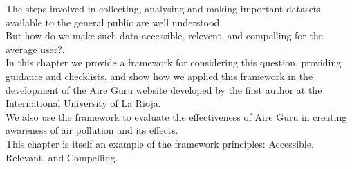 The steps involved in collecting, analysing and making important datasets available to the general public are well understood. \\

But how do we make such data accessible, relevent, and compelling for the average user?. \\

In this chapter we provide a framework for considering this question, providing guidance and checklists,
and show how we applied this framework in the development of the Aire Guru website developed by the first
author at the International University of La Rioja. \\

We also use the framework to evaluate the effectiveness of Aire Guru in creating awareness of air pollution and its effects. \\

This chapter is itself an example of the framework principles: Accessible, Relevant, and Compelling. \\